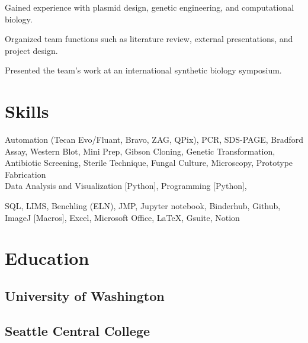 \documentclass[]{forrest-resume-interfont}
\begin{document}
\begin{tightemize}
    \item Gained experience with plasmid design, genetic engineering, and computational biology.
    \item Organized team functions such as literature review, external presentations, and project design.
    \item Presented the team's work at an international synthetic biology symposium.
\end{tightemize}

\linesep

\section{ Skills}
Automation (Tecan Evo/Fluant, Bravo, ZAG, QPix),
PCR, 
SDS-PAGE,
Bradford Assay,
Western Blot,
Mini Prep, 
Gibson Cloning,
Genetic Transformation,
Antibiotic Screening,
Sterile Technique, 
Fungal Culture, 
Microscopy, 
Prototype Fabrication
\\
\spacesep
{} %
Data Analysis and Visualization [Python],
Programming [Python],

SQL,
LIMS,
Benchling (ELN),
JMP,
Jupyter notebook,
Binderhub,
Github,
ImageJ [Macros],
Excel,
Microsoft Office,
LaTeX,
Gsuite,
Notion

\linesep


\section{ Education}
\subsection{University of Washington}
\spacesep
\subsection{Seattle Central College}

\vfill

\noindent\makebox[\linewidth]{\color{black}\rule{\paperwidth}{0.4pt}}
\end{document}
